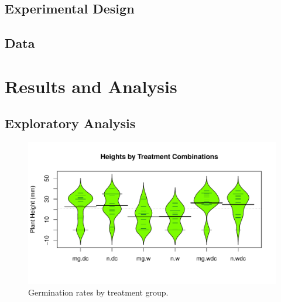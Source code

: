\documentclass[preprint,12pt]{elsarticle}\usepackage[]{graphicx}\usepackage[]{color}
\makeatletter
\def\maxwidth{ %
  \ifdim\Gin@nat@width>\linewidth
    \linewidth
  \else
    \Gin@nat@width
  \fi
}
\newenvironment{knitrout}{}{} %
\makeatother
\begin{document}
\subsection{Experimental Design}

\subsection{Data}


\section{Results and Analysis}
\subsection{Exploratory Analysis}
\begin{knitrout}
\color{fgcolor}\begin{figure}
\includegraphics[width=\maxwidth]{figure/eda-1} \caption[Germination rates by treatment group]{Germination rates by treatment group.}\label{fig:eda}
\end{figure}


\end{knitrout}
\end{document}
